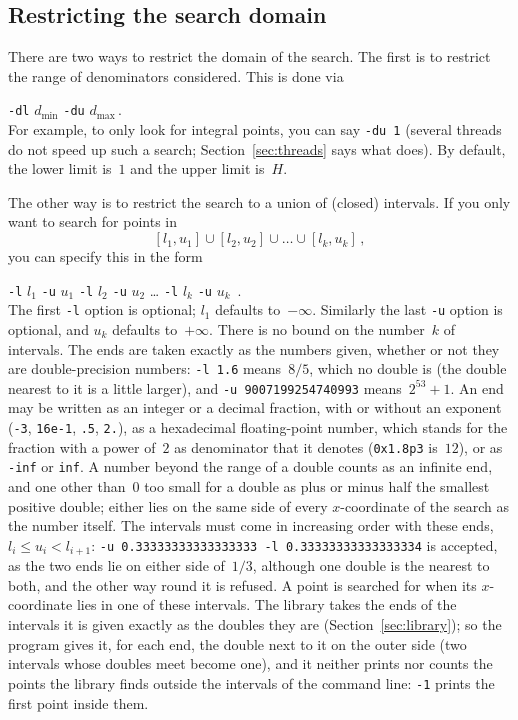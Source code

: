 \documentclass[12pt,a4paper,oneside]{amsart}
\begin{document}
\subsection{Restricting the search domain}\label{sec:domain}

There are two ways to restrict the domain of the search. The first is
to restrict the range of denominators considered. This is done via \\
\strut\quad\verb+-dl+ $d_{\text{min}}$ \verb+-du+ $d_{\text{max}}$\,. \\
For example, to only look for integral points, you can say \verb+-du 1+
(several threads do not speed up such a search; Section~\ref{sec:threads}
says what does).
By default, the lower limit is~$1$ and the upper limit is~$H$.

The other way is to restrict the search to a union of (closed) intervals.
If you only want to search for points in
\[ [l_1, u_1] \cup [l_2, u_2] \cup \dots \cup [l_k, u_k] \,, \]
you can specify this in the form \\
\strut\quad\verb+-l+ $l_1$ \verb+-u+ $u_1$ \verb+-l+ $l_2$ \verb+-u+ $u_2$ \dots
\verb+-l+ $l_k$ \verb+-u+ $u_k$ \,. \\
The first \verb+-l+ option is optional; $l_1$ defaults to~$-\infty$.
Similarly the last \verb+-u+ option is optional, and $u_k$ defaults
to~$+\infty$. There is no bound on the number~$k$ of intervals.
The ends are taken exactly as the numbers given, whether or not they are
double-precision numbers: \verb+-l 1.6+ means~$8/5$, which no double is
(the double nearest to it is a little larger), and
\verb+-u 9007199254740993+ means~$2^{53}+1$. An end may be written as an
integer or a decimal fraction, with or without an exponent (\verb+-3+,
\verb+16e-1+, \verb+.5+, \verb+2.+), as a hexadecimal floating-point
number, which stands for the fraction with a power of~$2$ as denominator
that it denotes (\verb+0x1.8p3+ is~$12$), or as \verb+-inf+ or \verb+inf+.
A number beyond the range of a double counts as an infinite end, and one
other than~$0$ too small for a double as plus or minus half the smallest
positive double; either lies on the same side of every $x$-coordinate of
the search as the number itself. The intervals must come in increasing
order with these ends, $l_i \le u_i < l_{i+1}$:
\verb+-u 0.33333333333333333 -l 0.33333333333333334+ is accepted, as the
two ends lie on either side of~$1/3$, although one double is the nearest
to both, and the other way round it is refused. A point is searched for
when its $x$-coordinate lies in one of these intervals. The library takes
the ends of the intervals it is given exactly as the doubles they are
(Section~\ref{sec:library}); so the program gives it, for each end, the
double next to it on the outer side (two intervals whose doubles meet
become one), and it neither prints nor counts the points the library
finds outside the intervals of the command line: \verb+-1+ prints the
first point inside them.
\end{document}
